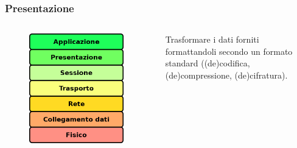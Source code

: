 \documentclass{beamer}
\begin{document}
\subsubsection*{Presentazione}
\begin{frame}{\insertsection}{\insertsubsection}
\begin{columns}
\begin{figure}
\includegraphics[width=0.95\textwidth]{imgs/01-iso-osi.drawio.png}
\end{figure}
\begin{block}{\insertsubsubsection}
Trasformare i dati forniti formattandoli secondo un formato standard
((de)codifica, (de)compressione, (de)cifratura).
\end{block}
\end{columns}
\end{frame}
\end{document}
